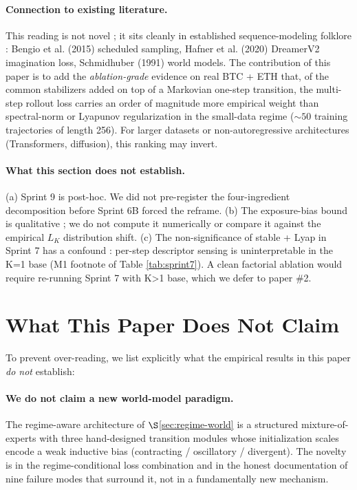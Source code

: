 \documentclass[11pt,a4paper]{article}
\begin{document}
\paragraph{Connection to existing literature.} This reading is
not novel ; it sits cleanly in established sequence-modeling
folklore : Bengio et al. (2015) scheduled sampling, Hafner et al.
(2020) DreamerV2 imagination loss, Schmidhuber (1991) world
models. The contribution of this paper is to add the
\emph{ablation-grade} evidence on real BTC + ETH that, of the
common stabilizers added on top of a Markovian one-step
transition, the multi-step rollout loss carries an order of
magnitude more empirical weight than spectral-norm or Lyapunov
regularization in the small-data regime ($\sim 50$ training
trajectories of length 256). For larger datasets or
non-autoregressive architectures (Transformers, diffusion), this
ranking may invert.

\paragraph{What this section does not establish.} (a) Sprint 9
is post-hoc. We did not pre-register the four-ingredient
decomposition before Sprint 6B forced the reframe. (b) The
exposure-bias bound is qualitative ; we do not compute it
numerically or compare it against the empirical $L_K$
distribution shift. (c) The non-significance of stable + Lyap
in Sprint 7 has a confound : per-step descriptor sensing is
uninterpretable in the K=1 base (M1 footnote of Table
\ref{tab:sprint7}). A clean factorial ablation would require
re-running Sprint 7 with K>1 base, which we defer to paper \#2.

\section{What This Paper Does Not Claim}
\label{sec:not-claim}

To prevent over-reading, we list explicitly what the empirical
results in this paper \emph{do not} establish:

\paragraph{We do not claim a new world-model paradigm.} The
regime-aware architecture of $\S$\ref{sec:regime-world} is a
structured mixture-of-experts \cite{shazeer2017moe} with three
hand-designed transition modules whose initialization scales encode a
weak inductive bias (contracting / oscillatory / divergent). The
novelty is in the regime-conditional loss combination and in the
honest documentation of nine failure modes that surround it, not in a
fundamentally new mechanism.
\end{document}

